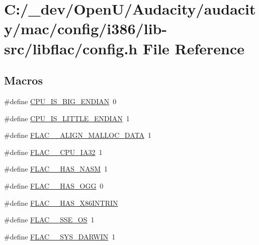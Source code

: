 \hypertarget{mac_2config_2i386_2lib-src_2libflac_2config_8h}{}\section{C\+:/\+\_\+dev/\+Open\+U/\+Audacity/audacity/mac/config/i386/lib-\/src/libflac/config.h File Reference}
\label{mac_2config_2i386_2lib-src_2libflac_2config_8h}
\subsection*{Macros}
\begin{DoxyCompactItemize}
\item 
\#define \hyperlink{mac_2config_2i386_2lib-src_2libflac_2config_8h_ab94a8b6379b0158c73f193e351a06c47}{C\+P\+U\+\_\+\+I\+S\+\_\+\+B\+I\+G\+\_\+\+E\+N\+D\+I\+AN}~0
\item 
\#define \hyperlink{mac_2config_2i386_2lib-src_2libflac_2config_8h_aab66c42b3a2cd5691035648eebd7e092}{C\+P\+U\+\_\+\+I\+S\+\_\+\+L\+I\+T\+T\+L\+E\+\_\+\+E\+N\+D\+I\+AN}~1
\item 
\#define \hyperlink{mac_2config_2i386_2lib-src_2libflac_2config_8h_a181ef4f5f1ebd09c8a4a9336977d9d62}{F\+L\+A\+C\+\_\+\+\_\+\+A\+L\+I\+G\+N\+\_\+\+M\+A\+L\+L\+O\+C\+\_\+\+D\+A\+TA}~1
\item 
\#define \hyperlink{mac_2config_2i386_2lib-src_2libflac_2config_8h_a21250853f84f38169fe60c039126446f}{F\+L\+A\+C\+\_\+\+\_\+\+C\+P\+U\+\_\+\+I\+A32}~1
\item 
\#define \hyperlink{mac_2config_2i386_2lib-src_2libflac_2config_8h_a28eabb81c94f13d64b5204333c9e82cb}{F\+L\+A\+C\+\_\+\+\_\+\+H\+A\+S\+\_\+\+N\+A\+SM}~1
\item 
\#define \hyperlink{mac_2config_2i386_2lib-src_2libflac_2config_8h_ac32f87833c80c6f0426c8609b2fe23b5}{F\+L\+A\+C\+\_\+\+\_\+\+H\+A\+S\+\_\+\+O\+GG}~0
\item 
\#define \hyperlink{mac_2config_2i386_2lib-src_2libflac_2config_8h_a5adcdee041b2ae289aa63735ca04f938}{F\+L\+A\+C\+\_\+\+\_\+\+H\+A\+S\+\_\+\+X86\+I\+N\+T\+R\+IN}
\item 
\#define \hyperlink{mac_2config_2i386_2lib-src_2libflac_2config_8h_a4d98a6efb795823d803df559d98ece6c}{F\+L\+A\+C\+\_\+\+\_\+\+S\+S\+E\+\_\+\+OS}~1
\item 
\#define \hyperlink{mac_2config_2i386_2lib-src_2libflac_2config_8h_aa66ca6a3738cff35d8ad244d0011190e}{F\+L\+A\+C\+\_\+\+\_\+\+S\+Y\+S\+\_\+\+D\+A\+R\+W\+IN}~1

\end{DoxyCompactItemize}
